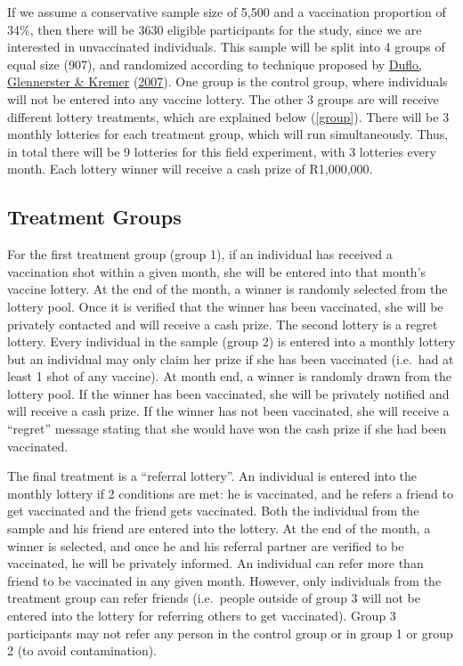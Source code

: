 \documentclass[11pt,preprint, authoryear]{elsarticle}
\numberwithin{equation}{section}
\numberwithin{figure}{section}
\numberwithin{table}{section}
\begin{document}
If we assume a conservative sample size of 5,500 and a vaccination
proportion of 34\%, then there will be 3630 eligible participants for
the study, since we are interested in unvaccinated individuals. This
sample will be split into 4 groups of equal size (907), and randomized
according to technique proposed by \protect\hyperlink{ref-random}{Duflo,
Glennerster \& Kremer} (\protect\hyperlink{ref-random}{2007}). One group
is the control group, where individuals will not be entered into any
vaccine lottery. The other 3 groups are will receive different lottery
treatments, which are explained below (\ref{group}). There will be 3
monthly lotteries for each treatment group, which will run
simultaneously. Thus, in total there will be 9 lotteries for this field
experiment, with 3 lotteries every month. Each lottery winner will
receive a cash prize of R1,000,000.

\hypertarget{treatment-groups}{%
\subsection{\texorpdfstring{Treatment Groups
\label{group}}{Treatment Groups }}\label{treatment-groups}}

For the first treatment group (group 1), if an individual has received a
vaccination shot within a given month, she will be entered into that
month's vaccine lottery. At the end of the month, a winner is randomly
selected from the lottery pool. Once it is verified that the winner has
been vaccinated, she will be privately contacted and will receive a cash
prize. The second lottery is a regret lottery. Every individual in the
sample (group 2) is entered into a monthly lottery but an individual may
only claim her prize if she has been vaccinated (i.e.~had at least 1
shot of any vaccine). At month end, a winner is randomly drawn from the
lottery pool. If the winner has been vaccinated, she will be privately
notified and will receive a cash prize. If the winner has not been
vaccinated, she will receive a ``regret'' message stating that she would
have won the cash prize if she had been vaccinated.

The final treatment is a ``referral lottery''. An individual is entered
into the monthly lottery if 2 conditions are met: he is vaccinated, and
he refers a friend to get vaccinated and the friend gets vaccinated.
Both the individual from the sample and his friend are entered into the
lottery. At the end of the month, a winner is selected, and once he and
his referral partner are verified to be vaccinated, he will be privately
informed. An individual can refer more than friend to be vaccinated in
any given month. However, only individuals from the treatment group can
refer friends (i.e.~people outside of group 3 will not be entered into
the lottery for referring others to get vaccinated). Group 3
participants may not refer any person in the control group or in group 1
or group 2 (to avoid contamination).
\end{document}
